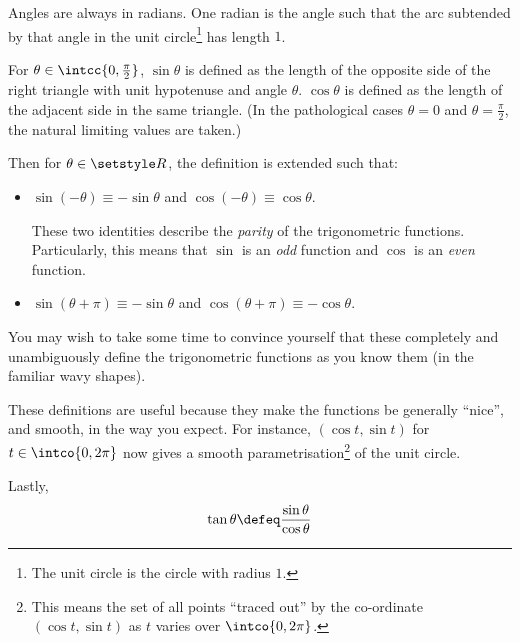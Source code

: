 Angles are always in radians. One radian is the angle such that the arc
subtended by that angle in the unit circle\footnote{
 The unit circle is the circle with radius \(1\).
} has length \(1\).

For \(\theta \in \intcc{0, \frac \pi 2}\), \(\sin \theta\) is defined as the
length of the opposite side of the right triangle with unit hypotenuse and angle
\(\theta\). \(\cos \theta\) is defined as the length of the adjacent side in the
same triangle. (In the pathological cases \(\theta = 0\) and
\(\theta = \frac \pi 2\), the natural limiting values are taken.)

Then for \(\theta \in \Reals\), the definition is extended such that:
\begin{itemize}
 \item
  \(\sin(-\theta) \equiv -\sin \theta\) and
  \(\cos(-\theta) \equiv \cos \theta\).

  These two identities describe the \emph{parity} of the trigonometric
  functions. Particularly, this means that \(\sin\) is an \emph{odd} function
  and \(\cos\) is an \emph{even} function.
 \item
  \(\sin(\theta + \pi) \equiv -\sin \theta\) and
  \(\cos(\theta + \pi) \equiv -\cos \theta\).
\end{itemize}
You may wish to take some time to convince yourself that these completely and
unambiguously define the trigonometric functions as you know them (in the
familiar wavy shapes).

These definitions are useful because they make the functions be generally
``nice'', and smooth, in the way you expect. For instance,
\((\cos t, \sin t)\) for \(t \in \intco{0, 2\pi}\) now gives a smooth
parametrisation\footnote{
 This means the set of all points ``traced out'' by the co-ordinate
 \((\cos t, \sin t)\) as \(t\) varies over
 \(\intco{0, 2\pi}\).
} of the unit circle.

Lastly,
\begin{equation*}
 \tan \theta \defeq \frac{\sin \theta}{\cos \theta}
\end{equation*}

